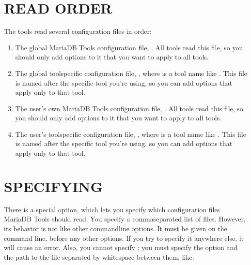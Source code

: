 \documentclass[letterpaper,10pt,english]{sphinxmanual}
\begin{document}
\section{READ ORDER}
\label{\detokenize{configuration_files:read-order}}
The tools read several configuration files in order:
\begin{enumerate}
%
\item {} 
The global MariaDB Tools configuration file,
.  All tools read this file,
so you should only add options to it that you want to apply to all tools.

\item {} 
The global tool\sphinxhyphen{}specific configuration file, ,
where  is a tool name like .  This file is named
after the specific tool you’re using, so you can add options that apply
only to that tool.

\item {} 
The user’s own MariaDB Tools configuration file,
.  All tools read this file, so you should only
add options to it that you want to apply to all tools.

\item {} 
The user’s tool\sphinxhyphen{}specific configuration file, ,
where  is a tool name like .  This file is named
after the specific tool you’re using, so you can add options that apply
only to that tool.

\end{enumerate}


\section{SPECIFYING}
\label{\detokenize{configuration_files:specifying}}
There is a special  option, which lets you specify which
configuration files MariaDB Tools should read.  You specify a
comma\sphinxhyphen{}separated list of files.  However, its behavior is not like other
command\sphinxhyphen{}line options.  It must be given  on the command line,
before any other options.  If you try to specify it anywhere else, it will
cause an error.  Also, you cannot specify ;
you must specify the option and the path to the file separated by whitespace
 between them, like:
\end{document}
